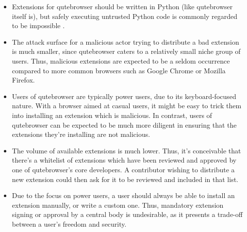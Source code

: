\documentclass[a4paper,parskip=full]{scrreprt}
\begin{document}
\begin{itemize}
  \item Extensions for qutebrowser should be written in Python (like qutebrowser itself
    is), but safely executing untrusted Python code is commonly regarded to be
    impossible \autocite{nedbat-eval, lwn-pysandbox}.
  \item The attack surface for a malicious actor trying to distribute a bad
    extension is much smaller, since qutebrowser caters to a relatively small
    niche group of users. Thus, malicious extensions are expected to be a seldom
    occurrence compared to more common browsers such as Google Chrome or Mozilla
    Firefox.
  \item Users of qutebrowser are typically power users, due to its
    keyboard-focused nature. With a browser aimed at casual users, it might be
    easy to trick them into installing an extension which is malicious. In
    contrast, users of qutebrowser can be expected to be much more diligent in ensuring that
    the extensions they're installing are not malicious.
  \item The volume of available extensions is much lower. Thus, it's conceivable
    that there's a whitelist of extensions which have been reviewed and approved
    by one of qutebrowser's core developers. A contributor wishing to distribute
    a new extension could then ask for it to be reviewed and included in that list.
  \item Due to the focus on power users, a user should always be able to
    install an extension manually, or write a custom one. Thus, mandatory
    extension signing or approval by a central body is undesirable, as it
    presents a trade-off between a user's freedom and security.
\end{itemize}

% 
% 
% 
% 
\end{document}
